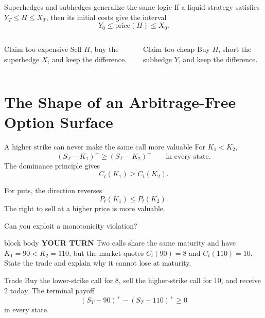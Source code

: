 \documentclass[handout,10pt,aspectratio=169]{beamer}
\newenvironment{pausebox}{\begin{beamercolorbox}[rounded=true,sep=0.8em,wd=\textwidth]{block body}
  \textbf{\color{CourseGold}YOUR TURN}\quad}{\end{beamercolorbox}}
\newcommand{\1}{\mathbf 1}
\begin{document}
\begin{frame}{Superhedges and subhedges generalize the same logic}
If a liquid strategy satisfies \(Y_T\le H\le X_T\), then its initial costs
give the interval
\[
\boxed{Y_0\le \text{price}(H)\le X_0.}
\]
\begin{columns}[T,onlytextwidth]
\begin{block}{Claim too expensive}
Sell \(H\), buy the superhedge \(X\), and keep the difference.
\end{block}
\begin{exampleblock}{Claim too cheap}
Buy \(H\), short the subhedge \(Y\), and keep the difference.
\end{exampleblock}
\end{columns}
\end{frame}

\section{The Shape of an Arbitrage-Free Option Surface}

\begin{frame}{A higher strike can never make the same call more valuable}
For \(K_1<K_2\),
\[
(S_T-K_1)^+\ge(S_T-K_2)^+
\qquad\text{in every state.}
\]
The dominance principle gives
\[
\boxed{C_t(K_1)\ge C_t(K_2).}
\]
\begin{block}{For puts, the direction reverses}
\[
P_t(K_1)\le P_t(K_2).
\]
The right to sell at a higher price is more valuable.
\end{block}
\end{frame}

\begin{frame}{Can you exploit a monotonicity violation?}
\begin{pausebox}
Two calls share the same maturity and have \(K_1=90<K_2=110\), but the
market quotes \(C_t(90)=8\) and \(C_t(110)=10\). State the trade and explain
why it cannot lose at maturity.
\end{pausebox}

\begin{exampleblock}{Trade}
Buy the lower-strike call for \(8\), sell the higher-strike call for \(10\),
and receive \(2\) today. The terminal payoff
\[
(S_T-90)^+-(S_T-110)^+\ge0
\]
in every state.
\end{exampleblock}
\end{frame}
\end{document}
